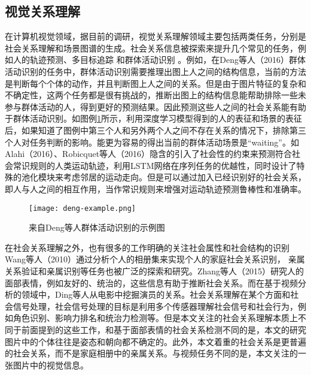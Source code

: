 \subsection{视觉关系理解}
在计算机视觉领域，据目前的调研，视觉关系理解领域主要包括两类任务，分别是社会关系理解和场景图谱的生成。社会关系信息被探索来提升几个常见的任务，例如人的轨迹预测、多目标追踪
\cite{chen2012discovering,qin2012improving}和群体活动识别
\cite{direkoglu2012team,lan2012social,lan2012discriminative}。例如，在Deng等人（2016）\cite{deng2016structure}群体活动识别的任务中，群体活动识别需要推理出图上人之间的结构信息，当前的方法是判断每个个体的动作，并且判断图上人之间的关系。但是由于图片特征的复杂和不确定性，这两个任务都是很有挑战的，推断出图上的结构信息能帮助排除一些未参与群体活动的人，得到更好的预测结果。因此预测这些人之间的社会关系能有助于群体活动识别。如图例\ref{fig:deng-example}所示，利用深度学习模型得到的人的表征和场景的表征后，如果知道了图例中第三个人和另外两个人之间不存在关系的情况下，排除第三个人对任务判断的影响。能更为容易的得出当前的群体活动场景是``waiting''。如Alahi（2016）\cite{alahi2016social}、Robicquet等人（2016）\cite{robicquet2016learning}隐含的引入了社会性的约束来预测符合社会常识规则的人类运动轨迹，利用LSTM网络在序列任务的优越性，同时设计了特殊的池化模块来考虑邻居的运动走向。但是可以通过加入已经识别好的社会关系，即人与人之间的相互作用，当作常识规则来增强对运动轨迹预测鲁棒性和准确率。
\begin{figure}[htpb]
	\centering
	\texttt{[image: deng-example.png]}
    \caption{来自Deng等人\cite{deng2016structure}群体活动识别的示例图}
	\vspace*{-3.5mm}
	\label{fig:deng-example}
\end{figure}

在社会关系理解之外，也有很多的工作明确的关注社会属性和社会结构的识别Wang等人（2010）\cite{wang2010seeing}通过分析个人的相册集来实现个人的家庭社会关系识别，
亲属关系验证\cite{dibeklioglu2013like,fang2010towards,xia2012understanding}和亲属识别\cite{chen2012discovering,guo2014graph}等任务也被广泛的探索和研究。Zhang等人（2015）\cite{zhang2015learning}研究人的面部表情，例如友好的、统治的，这些信息有助于推断社会关系。而在基于视频分析的领域中，Ding等人\cite{ding2014learning}从电影中挖掘演员的关系。社会关系理解在某个方面和社会信号处理\cite{vinciarelli2009social}，社会信号处理的目标是利用多个传感器理解社会信号和社会行为，例如角色识别、影响力排名和统治力检测等\cite{hung2007using,salamin2009automatic}。但是本文关注的社会关系理解本质上不同于前面提到的这些工作，和基于面部表情的社会关系检测不同的是，本文的研究图片中的个体往往是姿态和朝向都不确定的。此外，本文着重的社会关系是更普遍的社会关系，而不是家庭相册中的亲属关系。与视频任务不同的是，本文关注的一张图片中的视觉信息。

